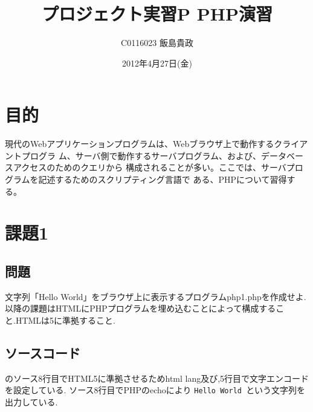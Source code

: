 \documentclass[a4j,10pt]{jsarticle}
\title{プロジェクト実習P PHP演習}
\author{C0116023 飯島貴政}
\date{2012年4月27日(金)}
\begin{document}
\maketitle


\section{目的}

現代のWebアプリケーションプログラムは、Webブラウザ上で動作するクライアントプログラ
ム、サーバ側で動作するサーバプログラム、および、データベースアクセスのためのクエリから
構成されることが多い。ここでは、サーバプログラムを記述するためのスクリプティング言語で
ある、PHPについて習得する。

\lstset{
    language = PHP,
    breaklines = true,
    breakindent = 10pt,
    basicstyle = \ttfamily\scriptsize,
    classoffset = 0,
    frame = TBrl,
    framesep = 5pt,
    numbers = left,
    stepnumber = 1,
    numberstyle = \tiny,
    tabsize = 4,
    captionpos = t
}

\section{課題1}

\subsection{問題}

文字列「Hello World」をブラウザ上に表示するプログラムphp1.phpを作成せよ.
以降の課題はHTMLにPHPプログラムを埋め込むことによって構成すること.HTMLは5に準拠すること.


\subsection{ソースコード}



のソース8行目でHTML5に準拠させるためhtml lang及び,5行目で文字エンコードを設定している.
ソース8行目でPHPのechoにより {\tt Hello World }という文字列を出力している.
\end{document}
